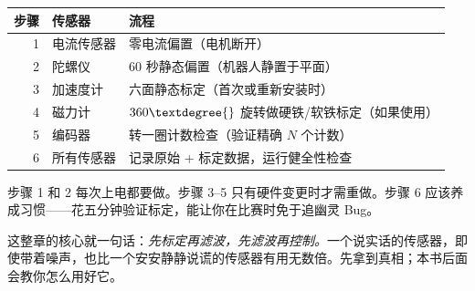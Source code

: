 \begin{center}
\begin{tabular}{rll}
\toprule
\textbf{步骤} & \textbf{传感器} & \textbf{流程} \\
\midrule
1 & 电流传感器 & 零电流偏置（电机断开） \\
2 & 陀螺仪 & 60 秒静态偏置（机器人静置于平面） \\
3 & 加速度计 & 六面静态标定（首次或重新安装时） \\
4 & 磁力计 & $360\textdegree{}$ 旋转做硬铁/软铁标定（如果使用） \\
5 & 编码器 & 转一圈计数检查（验证精确 $N$ 个计数） \\
6 & 所有传感器 & 记录原始 + 标定数据，运行健全性检查 \\
\bottomrule
\end{tabular}
\end{center}

步骤 1 和 2 每次上电都要做。步骤 3--5 只有硬件变更时才需重做。步骤 6 应该养成习惯——花五分钟验证标定，能让你在比赛时免于追幽灵 Bug。

这整章的核心就一句话：\textit{先标定再滤波，先滤波再控制。}一个说实话的传感器，即使带着噪声，也比一个安安静静说谎的传感器有用无数倍。先拿到真相；本书后面会教你怎么用好它。
